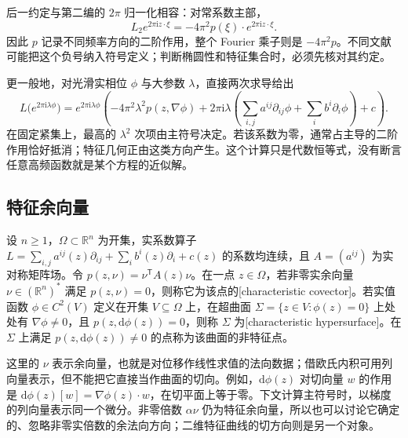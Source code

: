 后一约定与第二编的 \(2\pi\) 归一化相容：对常系数主部，
\[
 L_2e^{2\pi\mathrm i z\cdot\xi}
 =-4\pi^2p(\xi)\cdot e^{2\pi\mathrm i z\cdot\xi}.
\]
因此 \(p\) 记录不同频率方向的二阶作用，整个 Fourier 乘子则是 \(-4\pi^2p\)。不同文献可能把这个负号纳入符号定义；判断椭圆性和特征集合时，必须先核对其约定。

\ProseParagraphBreak

更一般地，对光滑实相位 \(\phi\) 与大参数 \(\lambda\)，直接两次求导给出
\[
 L\bigl(e^{2\pi\mathrm i\lambda\phi}\bigr)
 =e^{2\pi\mathrm i\lambda\phi}
 \left(-4\pi^2\lambda^2p(z,\nabla\phi)
 +2\pi\mathrm i\lambda\left(\sum_{i,j}a^{ij}\partial_{ij}\phi
 +\sum_i b^i\partial_i\phi\right)+c\right).
\]
在固定紧集上，最高的 \(\lambda^2\) 次项由主符号决定。若该系数为零，通常占主导的二阶作用恰好抵消；特征几何正由这类方向产生。这个计算只是代数恒等式，没有断言任意高频函数就是某个方程的近似解。

\subsection{特征余向量}
\label{b2:subsec:080103}

\begin{definition}\label{b2:def:08-characteristic-covector}
设 \(n\geq1\)，\(\Omega\subset\mathbb R^n\) 为开集，实系数算子 \(L=\sum_{i,j}a^{ij}(z)\partial_{ij}+\sum_i b^i(z)\partial_i+c(z)\) 的系数均连续，且 \(A=(a^{ij})\) 为实对称矩阵场。令 \(p(z,\nu)=\nu^{\mathsf T}A(z)\nu\)。在一点 \(z\in\Omega\)，若非零实余向量 \(\nu\in(\mathbb R^n)^*\) 满足 \(p(z,\nu)=0\)，则称它为该点的[characteristic covector]。若实值函数 \(\phi\in C^2(V)\) 定义在开集 \(V\subseteq\Omega\) 上，在超曲面 \(\Sigma=\{z\in V:\phi(z)=0\}\) 上处处有 \(\nabla\phi\ne0\)，且 \(p(z,\mathrm d\phi(z))=0\)，则称 \(\Sigma\) 为[characteristic hypersurface]。在 \(\Sigma\) 上满足 \(p(z,\mathrm d\phi(z))\ne0\) 的点称为该曲面的非特征点。
\end{definition}

这里的 \(\nu\) 表示余向量，也就是对位移作线性求值的法向数据；借欧氏内积可用列向量表示，但不能把它直接当作曲面的切向。例如，\(\mathrm d\phi(z)\) 对切向量 \(w\) 的作用是 \(\mathrm d\phi(z)[w]=\nabla\phi(z)\cdot w\)，在切平面上等于零。下文计算主符号时，以梯度的列向量表示同一个微分。非零倍数 \(\alpha\nu\) 仍为特征余向量，所以也可以讨论它确定的、忽略非零实倍数的余法向方向；二维特征曲线的切方向则是另一个对象。

\ProseParagraphBreak

